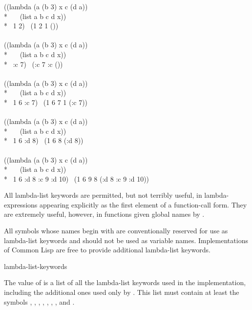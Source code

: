 \newpage%

\begin{lisp}
((lambda (a  (b 3)  x  c (d a)) \\*
~~~(list a b c d x)) \\*
~1 2)   \EV\ (1 2 {\nil} 1 ()) \\
 \\
((lambda (a  (b 3)  x  c (d a)) \\*
~~~(list a b c d x)) \\*
~:c 7)   \EV\ (:c 7 {\nil} :c ()) \\
 \\
((lambda (a  (b 3)  x  c (d a)) \\*
~~~(list a b c d x)) \\*
~1 6 :c 7)   \EV\ (1 6 7 1 (:c 7)) \\
 \\
((lambda (a  (b 3)  x  c (d a)) \\*
~~~(list a b c d x)) \\*
~1 6 :d 8)   \EV\ (1 6 {\nil} 8 (:d 8)) \\
 \\
((lambda (a  (b 3)  x  c (d a)) \\*
~~~(list a b c d x)) \\*
~1 6 :d 8 :c 9 :d 10)   \EV\ (1 6 9 8 (:d 8 :c 9 :d 10))
\end{lisp}

All lambda-list keywords are permitted, but not terribly useful, in
lambda-expressions appearing explicitly as the first element of a
function-call form.  They are extremely
useful, however, in functions given global names by .

All symbols whose names begin with \cd{\&} are conventionally reserved
for use as lambda-list keywords and should not be used as variable names.
Implementations of Common Lisp are free to provide additional lambda-list
keywords.

\begin{defun}[Constant]
lambda-list-keywords

The value of  is a list of all the lambda-list
keywords used in the implementation, including the additional ones
used only by .  This list must contain at least the symbols
, , , , , , ,
and .
\end{defun}

